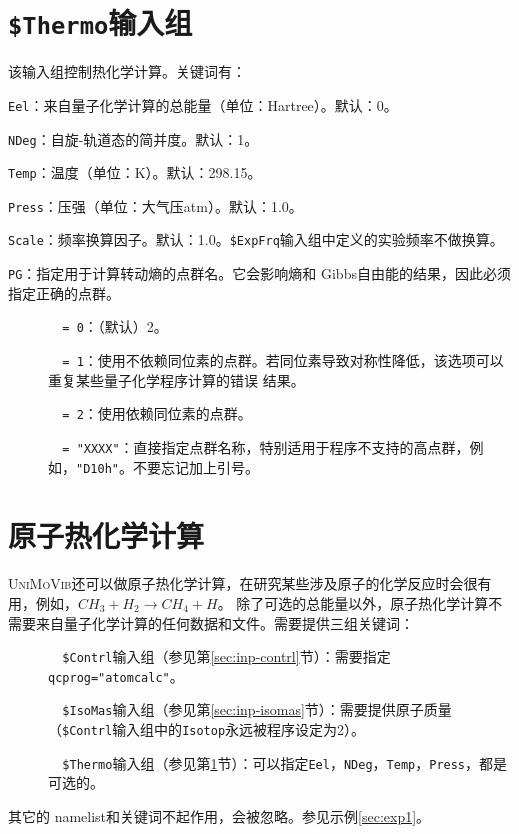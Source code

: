 \documentclass[12pt,a4paper,openany,twoside,cap]{ctexbook}
\begin{document}
\section{\texttt{\$Thermo}输入组} \label{sec:inp-thermo}

该输入组控制热化学计算。关键词有：

\bigskip{}
\verb|Eel|：来自量子化学计算的总能量（单位：Hartree）。默认：0。

\bigskip{}
\verb|NDeg|：自旋-轨道态的简并度。默认：1。

\bigskip{}
\verb|Temp|：温度（单位：K）。默认：298.15。

\bigskip{}
\verb|Press|：压强（单位：大气压atm）。默认：1.0。

\bigskip{}
\verb|Scale|：频率换算因子。默认：1.0。\texttt{\$ExpFrq}输入组中定义的实验频率不做换算。

\bigskip{}
\verb|PG|：指定用于计算转动熵的点群名。它会影响熵和 Gibbs自由能的结果，因此必须指定正确的点群。
\begin{description}
\item[ ]\verb|  = 0|：（默认）2。
\item[ ]\verb|  = 1|：使用不依赖同位素的点群。若同位素导致对称性降低，该选项可以重复某些量子化学程序计算的错误 结果。
\item[ ]\verb|  = 2|：使用依赖同位素的点群。
\item[ ]\verb|  = "XXXX"|：直接指定点群名称，特别适用于程序不支持的高点群，例如，\verb|"D10h"|。不要忘记加上引号。
\end{description}


\section{原子热化学计算} \label{sec:inp-atom}

\textsc{UniMoVib}还可以做原子热化学计算，在研究某些涉及原子的化学反应时会很有用，例如，$CH_3 + H_2 \rightarrow CH_4 + H$。
除了可选的总能量以外，原子热化学计算不需要来自量子化学计算的任何数据和文件。需要提供三组关键词：

\begin{description}
\item[ ]\verb|  $Contrl|输入组（参见第\ref{sec:inp-contrl}节）：需要指定\verb|qcprog="atomcalc"|。
\item[ ]\verb|  $IsoMas|输入组（参见第\ref{sec:inp-isomas}节）：需要提供原子质量（\verb|$Contrl|输入组中的\verb|Isotop|永远被程序设定为2）。
\item[ ]\verb|  $Thermo|输入组（参见第\ref{sec:inp-thermo}节）：可以指定\verb|Eel|，\verb|NDeg|，\verb|Temp|，\verb|Press|，都是可选的。
\end{description}
其它的 namelist和关键词不起作用，会被忽略。参见示例\ref{sec:exp1}。
\end{document}

